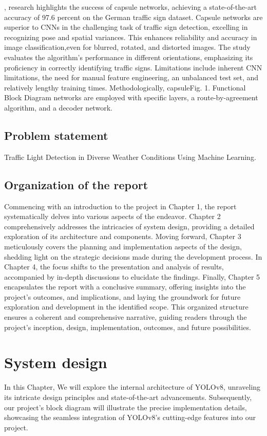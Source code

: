 \documentclass[12 pt]{report}
\begin{document}
{  \hspace*{1cm}{\bfseries  Amara Dinesh’s}, research highlights the success of capsule networks, achieving a state-of-the-art accuracy of 97.6 percent on the German traffic sign dataset. Capsule networks are superior to CNNs in the challenging task of traffic sign detection, excelling in recognizing pose and spatial variances. This enhances reliability and accuracy in image classification,even for blurred, rotated, and distorted images. The study evaluates the algorithm’s performance in different orientations, emphasizing its proficiency in correctly identifying traffic signs. Limitations include inherent CNN limitations, the need for manual feature engineering, an unbalanced test set, and relatively lengthy training times. Methodologically, capsuleFig. 1. Functional Block Diagram networks are employed with specific layers, a route-by-agreement algorithm, and a decoder network.
 }

\section{Problem statement}
Traffic Light Detection in Diverse Weather Conditions Using Machine Learning.
\section{Organization of the report}
\justify
Commencing with an introduction to the project in Chapter 1, the report systematically delves into various aspects of the endeavor.
Chapter 2 comprehensively addresses the intricacies of system design, providing a detailed exploration of its architecture and components.
Moving forward, Chapter 3 meticulously covers the planning and implementation aspects of the design, shedding light on the strategic decisions made during the development process.
In Chapter 4, the focus shifts to the presentation and analysis of results, accompanied by in-depth discussions to elucidate the findings. Finally, Chapter 5 encapsulates the report with a conclusive summary, offering insights into the project's outcomes, and implications, and laying the groundwork for future exploration and development in the identified scope. This organized structure ensures a coherent and comprehensive narrative, guiding readers through the project's inception, design, implementation, outcomes, and future possibilities.

\newpage
\chapter{System design}
\justify
In this Chapter, We will explore the internal architecture of YOLOv8, unraveling its intricate design principles and state-of-the-art advancements. Subsequently, our project's block diagram will illustrate the precise implementation details, showcasing the seamless integration of YOLOv8's cutting-edge features into our project.
\end{document}
